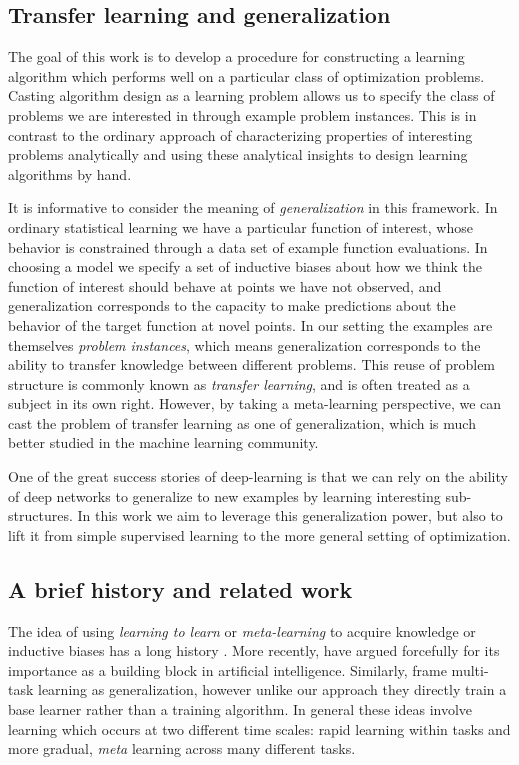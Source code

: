 \documentclass{article}
\begin{document}
\subsection{Transfer learning and generalization}

The goal of this work is to develop a procedure for constructing a learning
algorithm which performs well on a particular class of optimization problems.
Casting algorithm design as a learning problem allows us to specify the class
of problems we are interested in through example problem instances.  This is in
contrast to the ordinary approach of characterizing properties of interesting
problems analytically and using these analytical insights to design learning
algorithms by hand.

It is informative to consider the meaning of \emph{generalization} in this
framework.  In ordinary statistical learning we have a particular function of
interest, whose behavior is constrained through a data set of example function
evaluations.  In choosing a model we specify a set of inductive biases about
how we think the function of interest should behave at points we have not
observed, and generalization corresponds to the capacity to make predictions
about the behavior of the target function at novel points.
In our setting the examples are themselves \emph{problem instances}, which
means generalization corresponds to the ability to transfer knowledge between
different problems.  This reuse of problem structure is commonly known as
\emph{transfer learning}, and is often treated as a subject in its own right.
However, by taking a meta-learning perspective, we can cast the problem of
transfer learning as one of generalization, which is much better studied in the
machine learning community.

One of the great success stories of deep-learning is that we can rely on the
ability of deep networks to generalize to new examples by learning interesting
sub-structures. In this work we aim to leverage this generalization power, but
also to lift it from simple supervised learning to the more general setting of
optimization.

\subsection{A brief history and related work}

The idea of using \emph{learning to learn} or \emph{meta-learning} to acquire
knowledge or inductive biases has a long history \citep{thrun:1998}. More
recently, \cite{lake:2016} have argued forcefully for its importance as a
building block in artificial intelligence. Similarly, \cite{santoro:2016}
frame multi-task learning as generalization, however unlike our approach they
directly train a base learner rather than a training algorithm.  In general
these ideas involve learning which occurs at two different time scales: rapid
learning within tasks and more gradual, \emph{meta} learning across many
different tasks.
\end{document}
